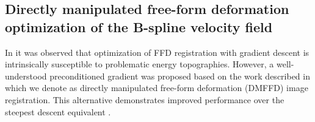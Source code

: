 \documentclass{llncs}
\begin{document}

\subsection{Directly manipulated free-form deformation optimization of the B-spline velocity field}

In \cite{tustison2009} 
it was observed that optimization of FFD registration with gradient descent is 
intrinsically susceptible to problematic energy topographies.  However, a
well-understood preconditioned gradient was proposed based on the work 
described in \cite{tustison2006} which we denote as directly manipulated
free-form deformation (DMFFD) image registration.  This alternative demonstrates 
improved performance over the steepest descent equivalent \cite{tustison2009}.
\end{document}
